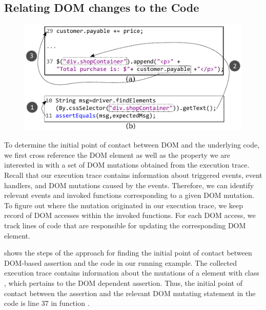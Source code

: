 \subsection{Relating DOM changes to the \javascript Code} \label{Sec:domToCode}
%
\begin{figure}[!t]
  \centering
  \includegraphics[width=1\hsize]{fig/assertionToCode}
  \vspace{-0.1in} 
  \label{Fig:assertionToCode}
  \vspace{-0.1in} 
\end{figure}
To determine the initial point of contact between DOM and the underlying \javascript code, we first cross reference the DOM element as well as the property we are interested in with a set of DOM mutations obtained from the execution trace. Recall that our execution trace contains information about triggered events, event handlers, and DOM mutations caused by the events. Therefore, we can identify relevant events and invoked functions corresponding to a given DOM mutation. To figure out where the mutation originated in our execution trace, we keep record of DOM accesses within the invoked functions. For each DOM access, we track \javascript lines of code that are responsible for updating the corresponding DOM element.

 shows the steps of the approach for finding the initial point of contact between DOM-based assertion and the \javascript code in our running example. The collected execution trace contains information about the mutations of a  element with class , which pertains to the DOM dependent assertion. Thus, the initial point of contact between the assertion and the relevant DOM mutating statement in the \javascript code is line 37 in function .

